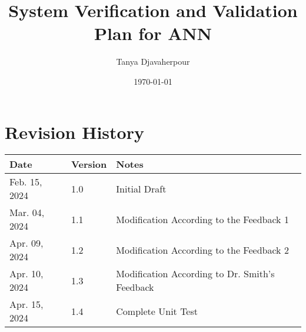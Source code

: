 \documentclass[12pt, titlepage]{article}
\begin{document}
\title{System Verification and Validation Plan for ANN} 
\author{Tanya Djavaherpour}
\date{\today}
	
\maketitle


\section*{Revision History}

\begin{tabularx}{\textwidth}{p{3cm}p{2cm}X}
\toprule {\bf Date} & {\bf Version} & {\bf Notes}\\
\midrule
Feb. 15, 2024 & 1.0 & Initial Draft\\
Mar. 04, 2024 & 1.1 & Modification According to the Feedback 1\\
Apr. 09, 2024 & 1.2 & Modification According to the Feedback 2\\
Apr. 10, 2024 & 1.3 & Modification According to Dr. Smith's Feedback\\
Apr. 15, 2024 & 1.4 & Complete Unit Test\\
\bottomrule
\end{tabularx}

~\\


\newpage

\tableofcontents

\listoftables
\end{document}
